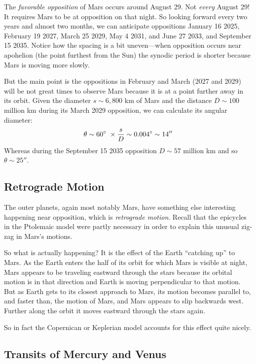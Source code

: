\documentclass[12pt, preprint]{aastex}
\begin{document}
The {\it favorable opposition} of Mars occurs around August 29. Not
{\it every} August 29! It requires Mars to be at opposition on that
night. So looking forward every two years and almost two months, we
can anticipate oppositions January 16 2025, February 19 2027, March 25
2029, May 4 2031, and June 27 2033, and September 15 2035. Notice how
the spacing is a bit uneven---when opposition occurs near apohelion
(the point furthest from the Sun) the synodic period is shorter
because Mars is moving more slowly.

But the main point is the oppositions in February and March (2027 and
2029) will be not great times to observe Mars because it is at a point
further away in its orbit. Given the diameter $s \sim 6,800$ km of
Mars and the distance $D \sim 100$ million km during its March 2029
opposition, we can calculate its angular diameter:
\begin{equation}
\theta \sim 60\degree\ \times \frac{s}{D} \sim 0.004\degree \sim 14''
\end{equation}
Whereas during the September 15 2035 opposition $D\sim 57$ million km
and so $\theta\sim 25''$.

\subsection{Retrograde Motion}

The outer planets, again most notably Mars, have something else
interesting happening near opposition, which is {\it retrograde
  motion}. Recall that the epicycles in the Ptolemaic model were
partly necessary in order to explain this unusual zig-zag in Mars's
motions. 

So what is actually happening? It is the effect of the Earth
``catching up'' to Mars. As the Earth enters the half of its orbit for
which Mars is visible at night, Mars appears to be traveling eastward
through the stars because its orbital motion is in that direction and
Earth is moving perpendicular to that motion. But as Earth gets to its
closest approach to Mars, its motion becomes parallel to, and faster
than, the motion of Mars, and Mars appears to slip backwards
west. Further along the orbit it moves eastward through the stars
again.

So in fact the Copernican or Keplerian model accounts for this effect
quite nicely.

\subsection{Transits of Mercury and Venus}
\end{document}

